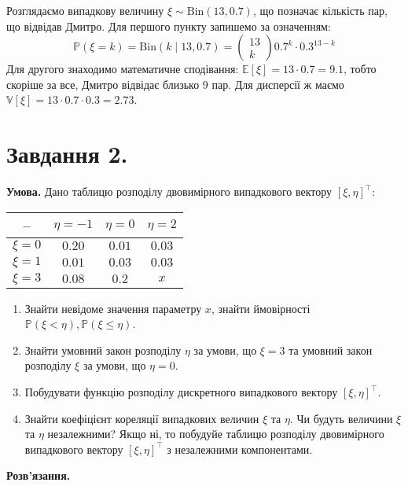 \documentclass[14pt]{extarticle}
\begin{document}
Розглядаємо випадкову величину $\xi \sim \text{Bin}(13,0.7)$, що позначає кількість пар, що відвідав Дмитро. Для першого пункту запишемо за означенням:
\[
\mathbb{P}(\xi=k)=\text{Bin}(k \mid 13,0.7) = \begin{pmatrix}
    13 \\ k
\end{pmatrix} 0.7^k \cdot 0.3^{13-k}
\]
Для другого знаходимо математичне сподівання: $\mathbb{E}[\xi] = 13 \cdot 0.7 = 9.1$, тобто скоріше за все, Дмитро відвідає близько $9$ пар. Для дисперсії ж маємо $\mathbb{V}[\xi] = 13 \cdot 0.7 \cdot 0.3 = 2.73$.

\section*{Завдання 2.}
\textbf{Умова.} Дано таблицю розподілу двовимірного випадкового вектору $[\xi,\eta]^{\top}$:
\begin{center}
\begin{tabular}{ |c|c|c|c| } 
 \hline
 -- & $\eta=-1$ & $\eta=0$ & $\eta=2$ \\ 
 \hline
 $\xi=0$ & $0.20$ & $0.01$ & $0.03$ \\ 
 \hline
 $\xi=1$ & $0.01$ & $0.03$ & $0.03$ \\ 
 \hline
 $\xi=3$ & $0.08$ & $0.2$ & $x$ \\
 \hline
\end{tabular}
\end{center}

\begin{enumerate}
    \item Знайти невідоме значення параметру $x$, знайти ймовірності $\mathbb{P}(\xi<\eta),\mathbb{P}(\xi \leq \eta)$.
    \item Знайти умовний закон розподілу $\eta$ за умови, що $\xi=3$ та умовний закон розподілу $\xi$ за умови, що $\eta=0$.
    \item Побудувати функцію розподілу дискретного випадкового вектору $[\xi,\eta]^{\top}$.
    \item Знайти коефіцієнт кореляції випадкових величин $\xi$ та $\eta$. Чи будуть величини $\xi$ та $\eta$ незалежними? Якщо ні, то побудуйе таблицю розподілу двовимірного випадкового вектору $[\xi,\eta]^{\top}$ з незалежними компонентами.
\end{enumerate}

\textbf{Розв'язання.}
\end{document}
